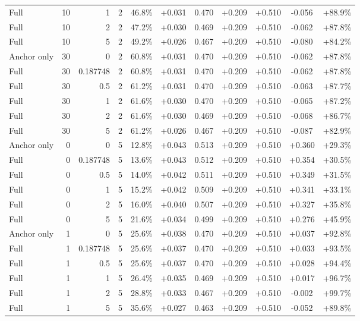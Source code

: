 \begin{table}[htbp]
\begin{tabular}{lrrrccccccc}
Full & 10 & 1 & 2 & 46.8\% & +0.031 & 0.470 & +0.209 & +0.510 & -0.056 & +88.9\% \\
Full & 10 & 2 & 2 & 47.2\% & +0.030 & 0.469 & +0.209 & +0.510 & -0.062 & +87.8\% \\
Full & 10 & 5 & 2 & 49.2\% & +0.026 & 0.467 & +0.209 & +0.510 & -0.080 & +84.2\% \\
Anchor only & 30 & 0 & 2 & 60.8\% & +0.031 & 0.470 & +0.209 & +0.510 & -0.062 & +87.8\% \\
Full & 30 & 0.187748 & 2 & 60.8\% & +0.031 & 0.470 & +0.209 & +0.510 & -0.062 & +87.8\% \\
Full & 30 & 0.5 & 2 & 61.2\% & +0.031 & 0.470 & +0.209 & +0.510 & -0.063 & +87.7\% \\
Full & 30 & 1 & 2 & 61.6\% & +0.030 & 0.470 & +0.209 & +0.510 & -0.065 & +87.2\% \\
Full & 30 & 2 & 2 & 61.6\% & +0.030 & 0.469 & +0.209 & +0.510 & -0.068 & +86.7\% \\
Full & 30 & 5 & 2 & 61.2\% & +0.026 & 0.467 & +0.209 & +0.510 & -0.087 & +82.9\% \\
Anchor only & 0 & 0 & 5 & 12.8\% & +0.043 & 0.513 & +0.209 & +0.510 & +0.360 & +29.3\% \\
Full & 0 & 0.187748 & 5 & 13.6\% & +0.043 & 0.512 & +0.209 & +0.510 & +0.354 & +30.5\% \\
Full & 0 & 0.5 & 5 & 14.0\% & +0.042 & 0.511 & +0.209 & +0.510 & +0.349 & +31.5\% \\
Full & 0 & 1 & 5 & 15.2\% & +0.042 & 0.509 & +0.209 & +0.510 & +0.341 & +33.1\% \\
Full & 0 & 2 & 5 & 16.0\% & +0.040 & 0.507 & +0.209 & +0.510 & +0.327 & +35.8\% \\
Full & 0 & 5 & 5 & 21.6\% & +0.034 & 0.499 & +0.209 & +0.510 & +0.276 & +45.9\% \\
Anchor only & 1 & 0 & 5 & 25.6\% & +0.038 & 0.470 & +0.209 & +0.510 & +0.037 & +92.8\% \\
Full & 1 & 0.187748 & 5 & 25.6\% & +0.037 & 0.470 & +0.209 & +0.510 & +0.033 & +93.5\% \\
Full & 1 & 0.5 & 5 & 25.6\% & +0.037 & 0.470 & +0.209 & +0.510 & +0.028 & +94.4\% \\
Full & 1 & 1 & 5 & 26.4\% & +0.035 & 0.469 & +0.209 & +0.510 & +0.017 & +96.7\% \\
Full & 1 & 2 & 5 & 28.8\% & +0.033 & 0.467 & +0.209 & +0.510 & -0.002 & +99.7\% \\
Full & 1 & 5 & 5 & 35.6\% & +0.027 & 0.463 & +0.209 & +0.510 & -0.052 & +89.8\% \\

\end{tabular}
\end{table}
